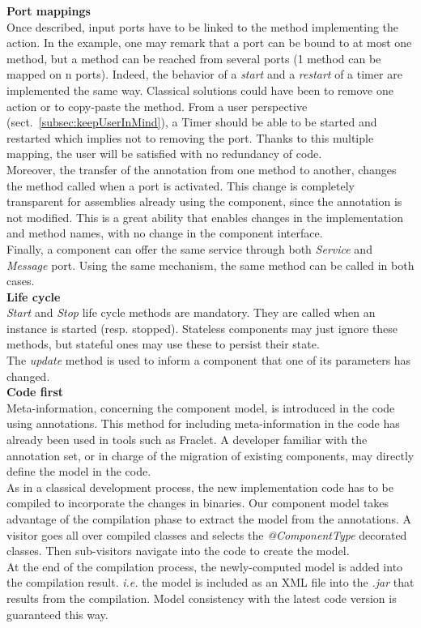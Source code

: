 {\bf Port mappings}\\
Once described, input ports have to be linked to the method implementing the action. In the example, one may remark that a port can be bound to at most one method, but a method can be reached from several ports (1 method can be mapped on n ports). Indeed, the behavior of a {\it start} and a {\it restart} of a timer are implemented the same way. Classical solutions could have been to remove one action or to copy-paste the method. From a user perspective (sect.~\ref{subsec:keepUserInMind}), a Timer should be able to be started and restarted which implies not to removing the port. Thanks to this multiple mapping, the user will be satisfied with no redundancy of code.\\
Moreover, the transfer of the annotation from one method to another, changes the method called when a port is activated. This change is completely transparent for assemblies already using the component, since the annotation is not modified. This is a great ability that enables changes in the implementation and method names, with no change in the component interface.\\
Finally, a component can offer the same service through both {\it Service} and {\it Message} port. Using the same mechanism, the same method can be called in both cases.\\

{\bf Life cycle}\\
{\it Start} and {\it Stop} life cycle methods are mandatory. They are called when an instance is started (resp. stopped). Stateless components may just ignore these methods, but stateful ones may use these to persist their state.\\
The {\it update} method is used to inform a component that one of its parameters has changed.\\

{\bf Code first}\\
Meta-information, concerning the component model, is introduced in the code using annotations. This method for including meta-information in the code has already been used in tools such as Fraclet\cite{Rouvoy:2009}. A developer familiar with the annotation set, or in charge of the migration of existing components, may directly define the model in the code.\\
As in a classical development process, the new implementation code has to be compiled to incorporate the changes in binaries. Our component model takes advantage of the compilation phase to extract the model from the annotations. A visitor goes all over compiled classes and selects the {\it @ComponentType} decorated classes. Then sub-visitors navigate into the code to create the model.\\
At the end of the compilation process, the newly-computed model is added into the compilation result. {\it i.e.} the model is included as an XML file into the {\it .jar} that results from the compilation. Model consistency with the latest code version is guaranteed this way.\\

